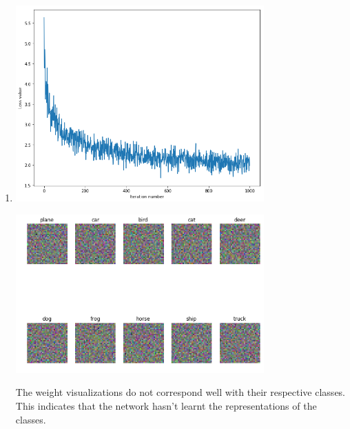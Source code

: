 \documentclass[11pt,english]{article}
\begin{document}
\begin{enumerate}
	\item 
	\begin{minipage}[t]{\linewidth}
	\centering

\includegraphics[width=0.75\textwidth]{images/training_loss.png}
\end{minipage}
\newpage
\begin{minipage}[t]{\linewidth}
	\centering
\includegraphics[width=0.75\textwidth]{images/visualization.png}
\end{minipage}
The weight visualizations do not correspond well with their respective classes. This indicates that the network hasn't learnt the representations of the classes.
\newpage


\end{enumerate}
\end{document}
